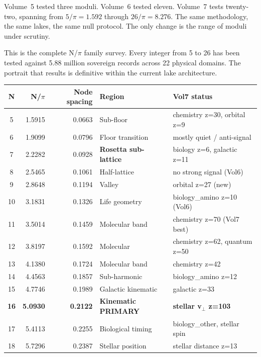 \documentclass[11pt, letterpaper, openany]{book}
\begin{document}
Volume~5 tested three moduli. Volume~6 tested eleven. Volume~7 tests twenty-two,
spanning from $5/\pi = 1.592$ through $26/\pi = 8.276$. The same methodology,
the same lakes, the same null protocol. The only change is the range of moduli under
scrutiny.

This is the complete N/$\pi$ family survey. Every integer from 5 to 26 has been tested
against 5.88 million sovereign records across 22 physical domains. The portrait that
results is definitive within the current lake architecture.

\begin{table}[H]
\centering
\renewcommand{\arraystretch}{1.35}
\small
\begin{tabular}{|c|r|r|l|l|}
\hline
\rowcolor{kishblue!15}
\textbf{N} & \textbf{N/$\pi$} & \textbf{Node spacing} & \textbf{Region} & \textbf{Vol7 status} \\
\hline\hline
5  & 1.5915 & 0.0663 & Sub-floor        & chemistry z=30, orbital z=9 \\
6  & 1.9099 & 0.0796 & Floor transition & mostly quiet / anti-signal \\
\rowcolor{rosettaorange!15}
7  & 2.2282 & 0.0928 & \textbf{Rosetta sub-lattice} & biology z=6, galactic z=11 \\
8  & 2.5465 & 0.1061 & Half-lattice     & no strong signal (Vol6) \\
9  & 2.8648 & 0.1194 & Valley           & orbital z=27 (new) \\
\rowcolor{signalgreen!10}
10 & 3.1831 & 0.1326 & Life geometry    & biology\_amino z=10 (Vol6) \\
11 & 3.5014 & 0.1459 & Molecular band   & chemistry z=70 (Vol7 best) \\
\rowcolor{signalgreen!10}
12 & 3.8197 & 0.1592 & Molecular        & chemistry z=62, quantum z=50 \\
13 & 4.1380 & 0.1724 & Molecular band   & chemistry z=42 \\
14 & 4.4563 & 0.1857 & Sub-harmonic     & biology\_amino z=12 \\
\rowcolor{signalgreen!10}
15 & 4.7746 & 0.1989 & Galactic kinematic & galactic z=33 \\
\rowcolor{kishblue!20}
\textbf{16} & \textbf{5.0930} & \textbf{0.2122} & \textbf{Kinematic PRIMARY} & \textbf{stellar v$_\perp$ z=103} \\
\rowcolor{signalgreen!10}
17 & 5.4113 & 0.2255 & Biological timing & biology\_other, stellar spin \\
\rowcolor{signalgreen!10}
18 & 5.7296 & 0.2387 & Stellar position  & stellar distance z=13 \\

\end{tabular}
\end{table}
\end{document}
